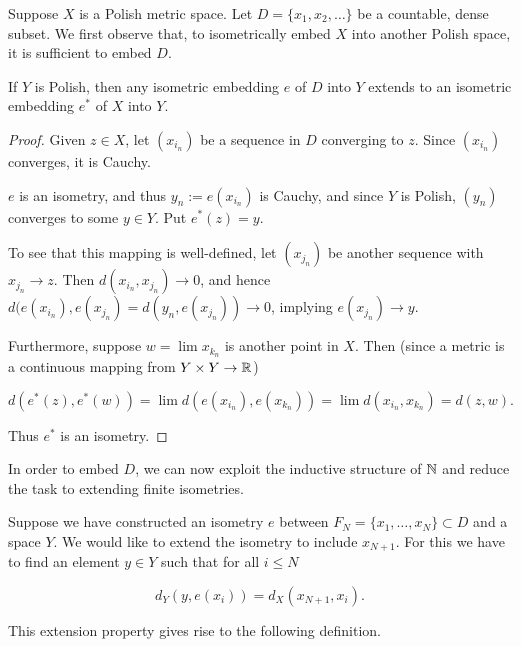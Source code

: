 Suppose $X$ is a Polish metric space. Let $D = \{x_1, x_2, \dots\}$ be a countable, dense subset. We first observe that, to isometrically embed $X$ into another Polish space, it is sufficient to embed $D$.

\begin{lemma}If $Y$ is Polish, then any isometric embedding $e$ of $D$ into $Y$ extends to an isometric embedding $e^*$ of $X$ into $Y$.

\end{lemma}\begin{proof}Given $z \in X$, let $(x_{i_n})$ be a sequence in $D$ converging to $z$. Since $(x_{i_n})$ converges, it is Cauchy.

$e$ is an isometry, and thus $y_n := e(x_{i_n})$ is Cauchy, and since $Y$ is Polish, $(y_n)$ converges to some $y \in Y$. Put $e^*(z) = y$.

To see that this mapping is well-defined, let $(x_{j_n})$ be another sequence with $x_{j_n} \to z$. Then $d(x_{i_n}, x_{j_n}) \to 0$, and hence $d(e(x_{i_n}),e(x_{j_n}) = d(y_n, e(x_{j_n}))\to 0$, implying $e(x_{j_n}) \to y$.

Furthermore, suppose $w = \lim x_{k_n}$ is another point in $X$. Then (since a metric is a continuous mapping from $Y\times Y \to \mathbb{R}$)

\begin{equation}
d(e^*(z), e^*(w)) = \lim d( e(x_{i_n}),  e(x_{k_n})) = \lim d(  x_{i_n}, x_{k_n}) = d(z,w).
\end{equation}

Thus $e^*$ is an isometry.

\end{proof}In order to embed $D$, we can now exploit the inductive structure of $\mathbb{N}$ and reduce the task to extending finite isometries.

Suppose we have constructed an isometry $e$ between $F_N = \{x_1, \dots, x_N \} \subset D$ and a space $Y$. We would like to extend the isometry to include $x_{N+1}$. For this we have to find an element $y \in Y$ such that for all $i \leq N$

\begin{equation}
d_Y(y, e(x_i)) = d_X(x_{N+1}, x_i).
\end{equation}

This extension property gives rise to the following definition.

